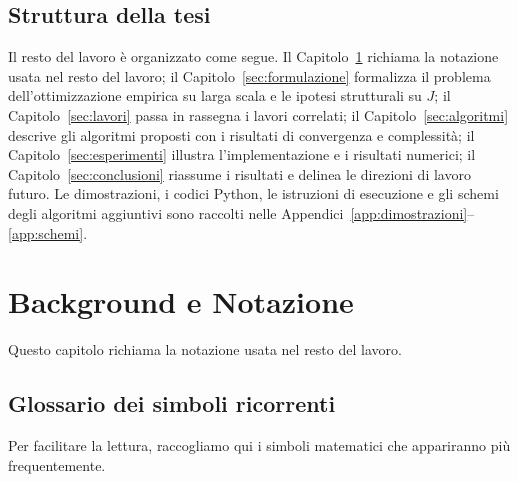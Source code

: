 \documentclass[a4paper,12pt]{article}
\numberwithin{equation}{section}
\numberwithin{figure}{section}
\numberwithin{table}{section}
\begin{document}
\subsection{Struttura della tesi}

Il resto del lavoro è organizzato come segue. Il Capitolo~\ref{sec:background}
richiama la notazione usata nel resto del lavoro; il Capitolo~\ref{sec:formulazione}
formalizza il problema dell'ottimizzazione empirica su larga scala e le
ipotesi strutturali su $J$; il Capitolo~\ref{sec:lavori} passa in rassegna i
lavori correlati; il Capitolo~\ref{sec:algoritmi} descrive gli algoritmi
proposti con i risultati di convergenza e complessità; il
Capitolo~\ref{sec:esperimenti} illustra l'implementazione e i risultati
numerici; il Capitolo~\ref{sec:conclusioni} riassume i risultati e delinea le
direzioni di lavoro futuro. Le dimostrazioni, i codici Python, le istruzioni
di esecuzione e gli schemi degli algoritmi aggiuntivi sono raccolti nelle
Appendici~\ref{app:dimostrazioni}--\ref{app:schemi}.

\section{Background e Notazione}\label{sec:background}

Questo capitolo richiama la notazione usata nel resto del lavoro.

\subsection{Glossario dei simboli ricorrenti}

Per facilitare la lettura, raccogliamo qui i simboli matematici che appariranno pi\`u frequentemente.
\end{document}
